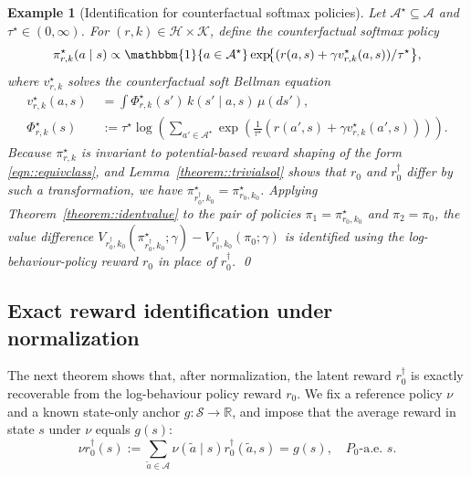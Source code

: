 \documentclass[12pt]{article}
\theoremstyle{plain}
\newtheorem{example}{Example}
\begin{document}
 
\begin{example}[Identification for counterfactual softmax policies] \label{ex:1}
Let $\mathcal{A}^\star \subseteq \mathcal{A}$ and $\tau^\star\in(0,\infty)$.
For $(r,k)\in\mathcal{H}\times\mathcal{K}$, define the counterfactual softmax policy
\begin{equation} \label{eqn::softmaxpolicycf}
\pi_{r,k}^\star(a\mid s)
\propto \mathbbm{1}\{a\in\mathcal{A}^\star\}
   \exp\!\bigl\{(r(a,s)+\gamma v_{r,k}^\star(a,s))/\tau^\star\bigr\},
\end{equation}
where \(v_{r,k}^\star\) solves the counterfactual soft Bellman equation
\begin{align}
\label{eqn::softbellmanCF}
v_{r,k}^\star(a,s)
\; &= \int \Phi_{r,k}^\star(s')\, k(s'\mid a,s)\,\mu(ds'),
\nonumber\\
\Phi_{r,k}^\star(s)
\; &:= \tau^\star \log\!\left(\sum_{a'\in\mathcal{A}^\star}
      \exp\!\left(\tfrac{1}{\tau^\star}(r(a',s)+\gamma v_{r,k}^\star(a',s))\right)\right).
\end{align}
Because $\pi_{r,k}^\star$ is invariant to potential-based reward shaping of the
form \eqref{eqn::equivclass}, and
Lemma~\ref{theorem::trivialsol} shows that $r_0$ and $r_0^\dagger$ differ by
such a transformation, we have
$\pi_{r_0^\dagger,k_0}^\star=\pi_{r_0,k_0}^\star$. Applying
Theorem~\ref{theorem::identvalue} to the pair of policies
$\pi_1=\pi_{r_0,k_0}^\star$ and $\pi_2=\pi_0$, the value difference
$V_{r_0^\dagger,k_0}(\pi_{r_0^\dagger,k_0}^\star;\gamma)
-
V_{r_0^\dagger,k_0}(\pi_0;\gamma)$
is identified using the log-behaviour-policy reward $r_0$ in place of
$r_0^\dagger$.
\qed
\end{example}




\subsection{Exact reward identification under normalization}
\label{sec:normalization}

The next theorem shows that, after normalization, the latent reward
\(r_0^\dagger\) is exactly recoverable from the log-behaviour policy reward
\(r_0\). We fix a reference policy \(\nu\) and a known state-only anchor
\(g:\mathcal{S}\to\mathbb{R}\), and impose that the average reward in state
\(s\) under \(\nu\) equals \(g(s)\):
\begin{equation}
\label{eqn::rdaggernorm}
    \nu r_0^\dagger(s)
    := \sum_{\tilde a \in \mathcal{A}} \nu(\tilde a \mid s)
       r_0^\dagger(\tilde a,s)
    = g(s),
    \quad P_0\text{-a.e.~} s.
\end{equation}
\end{document}
